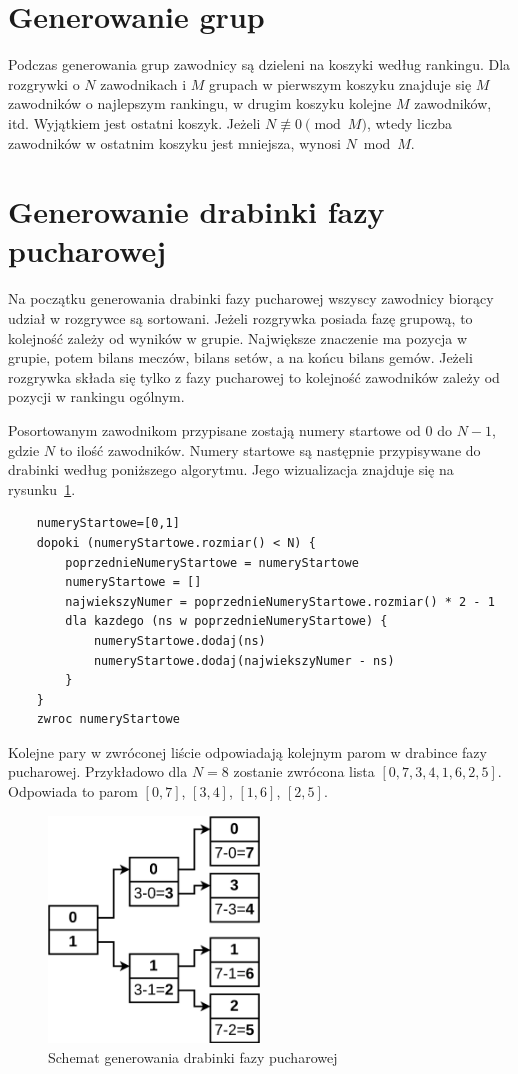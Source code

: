 \documentclass[shortabstract]{iithesis}
\begin{document}
\section{Generowanie grup}
Podczas generowania grup zawodnicy są dzieleni na koszyki według rankingu.
Dla rozgrywki o $N$ zawodnikach i $M$ grupach w pierwszym koszyku znajduje się $M$ zawodników o najlepszym rankingu, w drugim koszyku kolejne $M$ zawodników, itd.
Wyjątkiem jest ostatni koszyk. Jeżeli $N \not\equiv 0 \pmod{M}$, wtedy liczba zawodników w ostatnim koszyku jest mniejsza, wynosi $N\bmod{M}$.
\section{Generowanie drabinki fazy pucharowej}
Na początku generowania drabinki fazy pucharowej wszyscy zawodnicy biorący udział w rozgrywce są sortowani.
Jeżeli rozgrywka posiada fazę grupową, to kolejność zależy od wyników w grupie.
Największe znaczenie ma pozycja w grupie, potem bilans meczów, bilans setów, a na końcu bilans gemów.
Jeżeli rozgrywka składa się tylko z fazy pucharowej to kolejność zawodników zależy od pozycji w rankingu ogólnym.

Posortowanym zawodnikom przypisane zostają numery startowe od $0$ do $N-1$, gdzie $N$ to ilość zawodników.
Numery startowe są następnie przypisywane do drabinki według poniższego algorytmu. Jego wizualizacja znajduje się na rysunku~\ref{fig:knockout_bracket_generation}.
\begin{lstlisting}
    numeryStartowe=[0,1]
    dopoki (numeryStartowe.rozmiar() < N) {
        poprzednieNumeryStartowe = numeryStartowe
        numeryStartowe = []
        najwiekszyNumer = poprzednieNumeryStartowe.rozmiar() * 2 - 1
        dla kazdego (ns w poprzednieNumeryStartowe) {
            numeryStartowe.dodaj(ns)
            numeryStartowe.dodaj(najwiekszyNumer - ns)
        }
    }
    zwroc numeryStartowe
\end{lstlisting}
Kolejne pary w zwróconej liście odpowiadają kolejnym parom w drabince fazy pucharowej.
Przykładowo dla $N=8$ zostanie zwrócona lista $[0, 7, 3, 4, 1, 6, 2, 5]$. Odpowiada to parom
$[0, 7]$, $[3, 4]$, $[1, 6]$, $[2, 5]$.
\begin{figure}[H]
    \centering
    \includegraphics[width=0.5\textwidth]{assets/generowanie_drabinki.png}
    \caption{Schemat generowania drabinki fazy pucharowej}
    \label{fig:knockout_bracket_generation}
\end{figure}
\end{document}
